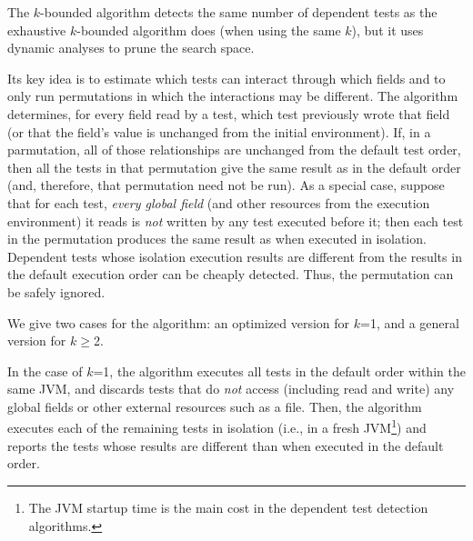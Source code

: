 

The \dependenceaware{} $k$-bounded algorithm
detects the same number of dependent tests
as the exhaustive $k$-bounded algorithm does (when using the same $k$),
but it uses dynamic analyses to prune the search space.

Its key idea is to estimate which tests can interact through which fields
and to only run permutations in which the interactions may be different.
The algorithm determines, for every field read by a test, which test
previously wrote that field (or that the field's value is unchanged from the
initial environment).
If, in a parmutation, all of those relationships are unchanged from the default
test order, then all the tests in that permutation give the same result as in the
default order (and, therefore, that permutation need not be run).  As a
special case, suppose that for each test,
\textit{every global field} (and other 
resources from the execution environment) it reads
is \textit{not} written by any test executed before it; then
each test in the permutation produces
the same result as when executed in isolation.
Dependent tests whose isolation execution results
are different from the results in the default execution order
can be cheaply detected.
Thus, the permutation can be safely ignored. 

We give two cases for the algorithm:  an optimized version for $k$=1, and
a general version for $k$$\ge$2.

In the case of $k$=1, the algorithm executes all tests in the default order
within the same JVM, and discards tests that do \textit{not}
access (including read and write) any global fields or
other external resources such as a file. Then,
the algorithm executes each of the remaining tests in isolation (i.e., in a
fresh JVM\footnote{The JVM startup time is the main cost in the
  dependent test detection algorithms.})
and reports the tests whose results are different than when executed in
the default order.

